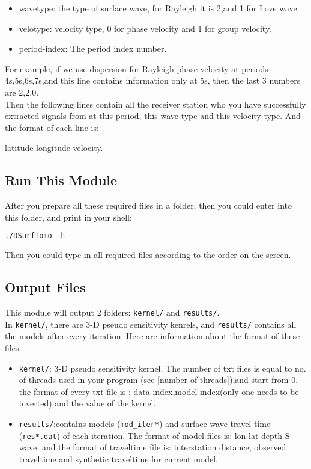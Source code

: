 \documentclass[UTF8]{article}
\begin{document}
    \begin{itemize}
        \item wavetype: the type of surface wave, for Rayleigh it is 2,and 1 for Love wave.
        \item velotype: velocity type, 0 for phase velocity and 1 for group velocity.
        \item period-index: The period index number.
    \end{itemize}
    For example, if we use dispersion for Rayleigh phase velocity 
    at periods 4s,5s,6s,7s,and this line contains information only at 5s, then the last 3 numbers 
    are 2,2,0.\\

    Then the following lines contain all the receiver station who you have successfully extracted
    signals from at this period, this wave type and this velocity type. And the format of each line 
    is:
    \begin{center}
        latitude longitude velocity.
    \end{center} 
    

    \subsection{Run This Module}
    After you prepare all these required files in a folder, then you could enter into this folder,
    and print in your shell:
    \begin{lstlisting}[language=bash]
    ./DSurfTomo -h
    \end{lstlisting}
    Then you could type in all required files according to the order on the screen.

    \subsection{Output Files}\label{surface wave output files}
    This module will output 2 folders: \verb!kernel/! and \verb!results/!. \\

    In \verb!kernel/!, there are 3-D pseudo sensitivity kenrels, and \verb!results/! contains 
    all the models after every iteration. Here are information about the format of these files:

    \begin{itemize}
    \item \verb!kernel/!: 3-D pseudo sensitivity kernel. The number of txt files is 
    equal to no. of threads used in your program (see \ref{number of threads}),and start from 0.
    the format of every txt file is : data-index,model-index(only one needs to be inverted) and 
    the value of the kernel.

    \item \verb!results/!:contains models (\verb!mod_iter*!)
                        and surface wave travel time (\verb!res*.dat!) of each iteration. The format 
                        of model files is: lon lat depth S-wave, and the format of 
                        traveltime file is: interstation distance, observed traveltime and 
                        synthetic traveltime for current model.
    \end{itemize}
\end{document}
